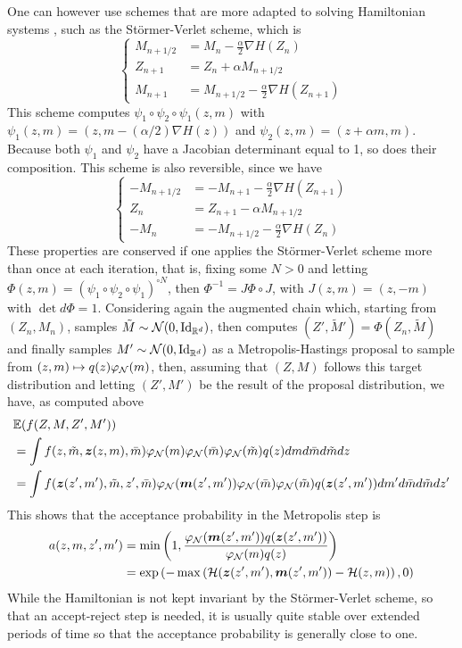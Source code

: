 One can however use schemes that are more adapted to solving Hamiltonian systems \citep{leimkuhler2005simulating}, such as the St\"ormer-Verlet scheme, which is
\[
\left\{
\begin{aligned}
M_{n+1/2} & = M_n - \frac{\alpha}{2} \nabla H(Z_n)\\
Z_{n+1} &= Z_n + \alpha M_{n+1/2}\\
M_{n+1} & = M_{n+1/2} - \frac{\alpha}{2} \nabla H(Z_{n+1})
\end{aligned}
\right.
\]
This scheme computes $\psi_1\circ \psi_2 \circ \psi_1(z,m)$ with $\psi_1(z,m) = (z, m - (\alpha/2) \nabla H(z))$ and $\psi_2(z,m) = (z+ \alpha m, m)$. Because both $\psi_1$ and $\psi_2$ have a Jacobian determinant equal to 1, so does their composition. This scheme is also reversible, since we have
\[
\left\{
\begin{aligned}
  -M_{n+1/2} &= - M_{n+1} - \frac{\alpha}{2} \nabla H(Z_{n+1})\\
  Z_{n} &= Z_{n+1} - \alpha M_{n+1/2}\\
-M_{n} & = -M_{n+1/2} - \frac{\alpha}{2} \nabla H(Z_n)
\end{aligned}
\right.
\]
These properties are conserved if one applies the St\"ormer-Verlet scheme more than once at each iteration, that is, fixing some $N>0$ and letting $\Phi(z,m) = (\psi_1 \circ \psi_2 \circ \psi_1)^{\circ N}$, then $\Phi^{-1} = J\Phi \circ J$, with $J(z,m) = (z,-m)$ with $\det d\Phi = 1$. Considering again the augmented chain which, starting from $(Z_n, M_n)$, samples $\tilde M \sim \CN(0, \Id[d])$, then computes $(Z', \tilde M') = \Phi(Z_n, \tilde M)$ and finally samples $M'\sim \CN(0, \Id[d])$ as a Metropolis-Hastings proposal to sample from $(z,m) \mapsto q(z) \varphi_{{\mathcal N}}(m)$, then, assuming that $(Z, M)$ follows this target distribution and letting $(Z', M')$ be the result of the proposal distribution, we have, as computed above 
\begin{align*}
& \bm{\mathbb E}(f(Z, M, Z', M') ) \\
&= \int f(z, \tilde m, {\bm{z}}(z, m), \bar m) \varphi_{{\mathcal N}}(m) \varphi_{{\mathcal N}}(\bar m) \varphi_{{\mathcal N}}(\tilde m) q(z) dm d\bar m d\tilde m dz
\\
 &= 
\int f({\bm{z}}(z', m'), \tilde m, z', \bar m) \varphi_{{\mathcal N}}({\bm{m}}(z',m')) \varphi_{{\mathcal N}}(\bar m) \varphi_{{\mathcal N}}(\tilde m) q({\bm{z}}(z', m')) dm' d\bar m d\tilde m dz'
\end{align*}
This shows that the acceptance probability in the Metropolis step is
\begin{align*}
a(z,m, z', m') &= \min\left(1, \frac{\varphi_{{\mathcal N}}({\bm{m}}(z',m'))q({\bm{z}}(z', m'))}{\varphi_{{\mathcal N}}(m)q(z)}\right) \\
&= \exp\left( - \max\left( {\mathcal H}({\bm{z}}(z', m'), {\bm{m}}(z',m')) -{\mathcal H}(z,m)\right), 0\right)
\end{align*}
While the Hamiltonian is not kept invariant by the St\"ormer-Verlet scheme, so that an accept-reject step is needed, it is usually quite stable over extended periods of time so that the acceptance probability is generally close to one.


